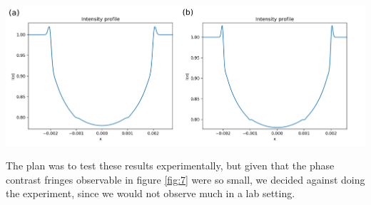 \documentclass[10pt, a4paper, singlespacing]{report}
\newenvironment{Figure}
    {\par\medskip\noindent\minipage{\linewidth}}
    {\endminipage\par\medskip}
\begin{document}
\begin{Figure}\label{fig:7}
\centering
\includegraphics[width=\linewidth]{LAB_ice_water_AS_2_magnifications.pdf}
\end{Figure}
The plan was to test these results experimentally, but given that the phase contrast fringes observable in figure \ref{fig:7} were so small, we decided against doing the experiment, since we would not observe much in a lab setting. 
\end{document}
